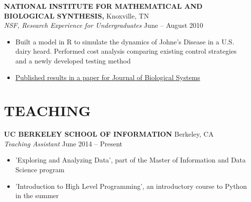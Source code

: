 \documentclass[geomargin]{res}
\begin{document}
\begin{resume}
{\bf NATIONAL INSTITUTE FOR MATHEMATICAL AND BIOLOGICAL SYNTHESIS,} Knoxville, TN \\
{\em NSF, Research Experience for Undergraduates}    \hfill
June -- August 2010 \\                                          \vspace{-4mm}
\begin{itemize}                                         \itemsep1pt 
        \item Built a model in R to simulate the dynamics of Johne's Disease in a U.S. dairy heard. Performed cost analysis comparing existing control strategies and a newly developed testing method
        \item \href{http://www.worldscientific.com/doi/abs/10.1142/S021833901340010X}{Published results in a paper for Journal of Biological Systems}
\end{itemize}
\vspace{-2mm}


\section{TEACHING}
{\bf UC BERKELEY SCHOOL OF INFORMATION} Berkeley, CA \\
{\em Teaching Assistant} \hfill
June 2014 -- Present \\                                          \vspace{-4mm}
\begin{itemize}                                         \itemsep1pt %
        \item   'Exploring and Analyzing Data', part of the Master of Information and Data Science program
        \item   'Introduction to High Level Programming', an introductory course to Python in the summer
\end{itemize}
\vspace{-2mm}


\end{resume}
\end{document}
